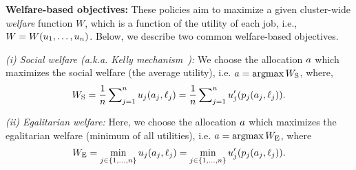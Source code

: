 
\textbf{Welfare-based objectives:}
These policies aim to maximize a given cluster-wide \emph{welfare} function $W$, which
is a function of the utility of each job,
i.e., $W = W(u_{1},\dots,u_{n})$.
Below, we describe two common welfare-based objectives.





\emph{(i) Social welfare (a.k.a. Kelly mechanism~\cite{kelly1998rate}):}
We choose the allocation $a$ which maximizes the social welfare (the average utility),
i.e. $a = \mathop{\mathrm{argmax}} W_{\rm S}$, where,
\vspace{-0.05in}
\begin{align}
W_{\rm S} = \frac{1}{n}\sum\nolimits_{j=1}^n u_{j}(a_{j}, \ell_{j})
        = \frac{1}{n}\sum\nolimits_{j=1}^n u'_{j}(p_{j}(a_{j}, \ell_{j})).
\label{eqn:socwel}
\end{align}


\emph{(ii) Egalitarian welfare:}
Here, we choose the allocation $a$ which maximizes the egalitarian welfare
(minimum of all utilities),
i.e. $a = \mathop{\mathrm{argmax}} W_{\rm E}$, where
\vspace{-0.05in}
\begin{align}
W_{\rm E} = \min_{j\in\{1,\dots,n\}} u_{j}(a_{j}, \ell_{j})
         = \min_{j\in\{1,\dots,n\}} u'_{j}(p_{j}(a_{j}, \ell_{j})).
\label{eqn:egalwel}
\end{align}


